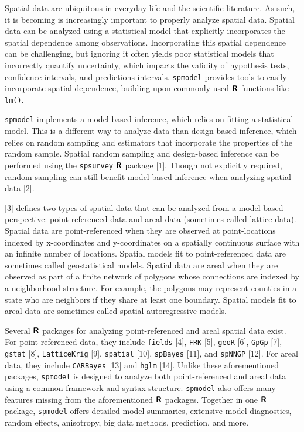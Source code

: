 \documentclass[10pt,letterpaper]{article}
\begin{document}
Spatial data are ubiquitous in everyday life and the scientific
literature. As such, it is becoming is increasingly important to
properly analyze spatial data. Spatial data can be analyzed using a
statistical model that explicitly incorporates the spatial dependence
among observations. Incorporating this spatial dependence can be
challenging, but ignoring it often yields poor statistical models that
incorrectly quantify uncertainty, which impacts the validity of
hypothesis tests, confidence intervals, and predictions intervals.
\texttt{spmodel} provides tools to easily incorporate spatial
dependence, building upon commonly used \(\textbf{\textsf{R}}\)
functions like \texttt{lm()}.

\texttt{spmodel} implements a model-based inference, which relies on
fitting a statistical model. This is a different way to analyze data
than design-based inference, which relies on random sampling and
estimators that incorporate the properties of the random sample. Spatial
random sampling and design-based inference can be performed using the
\texttt{spsurvey} \(\textbf{\textsf{R}}\) package {[}1{]}. Though not
explicitly required, random sampling can still benefit model-based
inference when analyzing spatial data {[}2{]}.

{[}3{]} defines two types of spatial data that can be analyzed from a
model-based perspective: point-referenced data and areal data (sometimes
called lattice data). Spatial data are point-referenced when they are
observed at point-locations indexed by x-coordinates and y-coordinates
on a spatially continuous surface with an infinite number of locations.
Spatial models fit to point-referenced data are sometimes called
geostatistical models. Spatial data are areal when they are observed as
part of a finite network of polygons whose connections are indexed by a
neighborhood structure. For example, the polygons may represent counties
in a state who are neighbors if they share at least one boundary.
Spatial models fit to areal data are sometimes called spatial
autoregressive models.

Several \(\textbf{\textsf{R}}\) packages for analyzing point-referenced
and areal spatial data exist. For point-referenced data, they include
\texttt{fields} {[}4{]}, \texttt{FRK} {[}5{]}, \texttt{geoR} {[}6{]},
\texttt{GpGp} {[}7{]}, \texttt{gstat} {[}8{]}, \texttt{LatticeKrig}
{[}9{]}, \texttt{spatial} {[}10{]}, \texttt{spBayes} {[}11{]}, and
\texttt{spNNGP} {[}12{]}. For areal data, they include \texttt{CARBayes}
{[}13{]} and \texttt{hglm} {[}14{]}. Unlike these aforementioned
packages, \texttt{spmodel} is designed to analyze both point-referenced
and areal data using a common framework and syntax structure.
\texttt{spmodel} also offers many features missing from the
aforementioned \(\textbf{\textsf{R}}\) packages. Together in one
\(\textbf{\textsf{R}}\) package, \texttt{spmodel} offers detailed model
summaries, extensive model diagnostics, random effects, anisotropy, big
data methods, prediction, and more.
\end{document}
